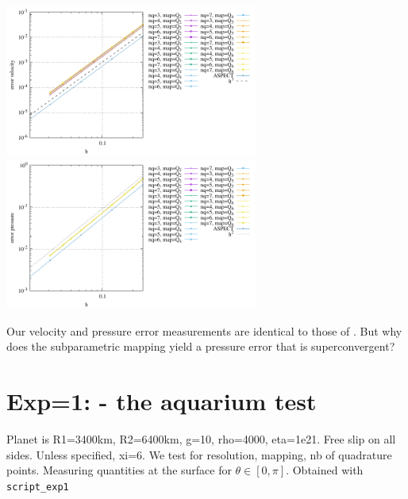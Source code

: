 \begin{center}
\includegraphics[width=8.3cm]{python_codes/fieldstone_152/RESULTS/exp0/errv}
\includegraphics[width=8.3cm]{python_codes/fieldstone_152/RESULTS/exp0/errp}
\end{center}

Our velocity and pressure error measurements are identical to those of \aspect.
But why does the subparametric mapping yield a pressure error that is superconvergent?













\newpage
\section*{Exp=1: - the aquarium test}

Planet is R1=3400km, R2=6400km, g=10, rho=4000, eta=1e21.
Free slip on all sides. Unless specified, xi=6.
We test for resolution, mapping, nb of quadrature points.
Measuring quantities at the surface for $\theta\in[0,\pi]$.
Obtained with {\tt script\_exp1}


